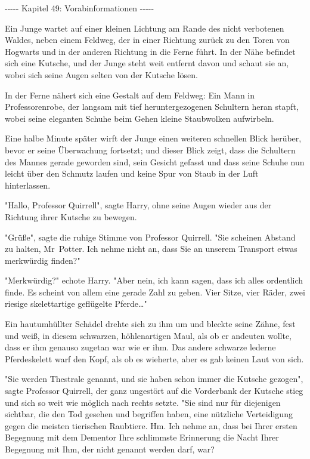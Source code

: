 

\hypertarget{vorabinformationen}{%

-\/-\/-\/-\/- Kapitel 49: Vorabinformationen -\/-\/-\/-\/-

Ein Junge wartet auf einer kleinen Lichtung am Rande des nicht verbotenen Waldes, neben einem Feldweg, der in einer Richtung zurück zu den Toren von Hogwarts und in der anderen Richtung in die Ferne führt. In der Nähe befindet sich eine Kutsche, und der Junge steht weit entfernt davon und schaut sie an, wobei sich seine Augen selten von der Kutsche lösen.

In der Ferne nähert sich eine Gestalt auf dem Feldweg: Ein Mann in Professorenrobe, der langsam mit tief heruntergezogenen Schultern heran stapft, wobei seine eleganten Schuhe beim Gehen kleine Staubwolken aufwirbeln.

Eine halbe Minute später wirft der Junge einen weiteren schnellen Blick herüber, bevor er seine Überwachung fortsetzt; und dieser Blick zeigt, dass die Schultern des Mannes gerade geworden sind, sein Gesicht gefasst und dass seine Schuhe nun leicht über den Schmutz laufen und keine Spur von Staub in der Luft hinterlassen.

"Hallo, Professor Quirrell", sagte Harry, ohne seine Augen wieder aus der Richtung ihrer Kutsche zu bewegen.

"Grüße", sagte die ruhige Stimme von Professor Quirrell. "Sie scheinen Abstand zu halten, Mr~Potter. Ich nehme nicht an, dass Sie an unserem Transport etwas merkwürdig finden?"

"Merkwürdig?" echote Harry. "Aber nein, ich kann sagen, dass ich alles ordentlich finde. Es scheint von allem eine gerade Zahl zu geben. Vier Sitze, vier Räder, zwei riesige skelettartige geflügelte Pferde…"

Ein hautumhüllter Schädel drehte sich zu ihm um und bleckte seine Zähne, fest und weiß, in diesem schwarzen, höhlenartigen Maul, als ob er andeuten wollte, dass er ihm genauso zugetan war wie er ihm. Das andere schwarze lederne Pferdeskelett warf den Kopf, als ob es wieherte, aber es gab keinen Laut von sich.

"Sie werden Thestrale genannt, und sie haben schon immer die Kutsche gezogen", sagte Professor Quirrell, der ganz ungestört auf die Vorderbank der Kutsche stieg und sich so weit wie möglich nach rechts setzte. "Sie sind nur für diejenigen sichtbar, die den Tod gesehen und begriffen haben, eine nützliche Verteidigung gegen die meisten tierischen Raubtiere. Hm. Ich nehme an, dass bei Ihrer ersten Begegnung mit dem Dementor Ihre schlimmste Erinnerung die Nacht Ihrer Begegnung mit Ihm, der nicht genannt werden darf, war?

}
